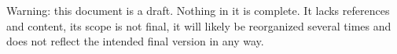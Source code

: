 %

Warning: this document is a draft. Nothing in it is complete. It lacks references and content, its scope is not final, it will likely be reorganized several times and does not reflect the intended final version in any way.















\appendix


